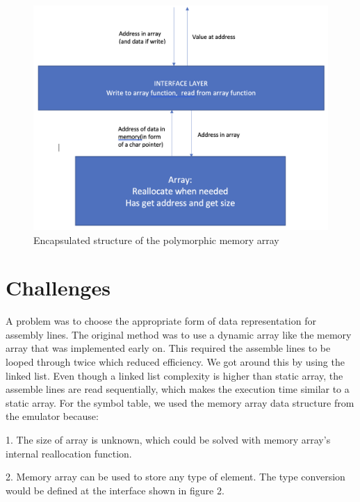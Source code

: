 \documentclass[11pt]{article}
\begin{document}
\begin{figure}
\centering
\begin{minipage}{.5\textwidth}
\centering
\includegraphics[width = \linewidth]{ mem_array }
\caption{Encapsulated structure of the polymorphic memory array}
\label{fig:assembly}
\end{minipage}\hfill
\end{figure}

\section{Challenges}
    A problem was to choose the appropriate form of data representation for assembly lines. The original method was to use a dynamic array like the memory array that was implemented early on. This required the assemble lines to be looped through twice which reduced efficiency. We got around this by using the linked list. Even though a linked list complexity is higher than static array, the assemble lines are read sequentially, which makes the execution time similar to a static array.\newline
    For the symbol table, we used the memory array data structure from the emulator because:
    
    1. The size of array is unknown, which could be solved with memory array's internal reallocation function.
    
    2. Memory array can be used to store any type of element. The type conversion would be defined at the interface shown in figure 2.
\end{document}
